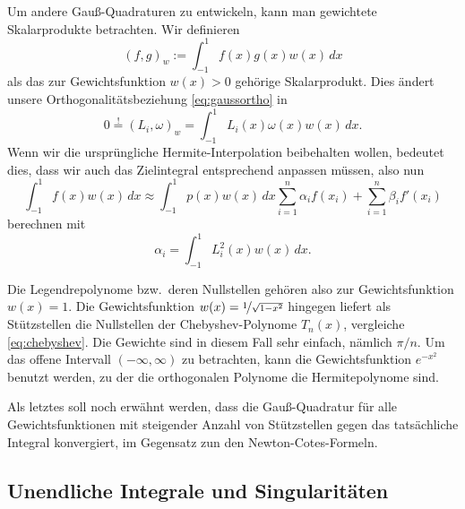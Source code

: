 Um andere Gauß-Quadraturen zu entwickeln, kann man gewichtete
Skalarprodukte betrachten. Wir definieren
\begin{equation}
  (f,g)_w := \int_{-1}^1 f(x)g(x)w(x)\, dx
\end{equation}
als das zur Gewichtsfunktion $w(x)>0$ gehörige Skalarprodukt. Dies
ändert unsere Orthogonalitätsbeziehung \eqref{eq:gaussortho} in
\begin{equation}
  0 \stackrel{!}{=} (L_i,\omega)_w = \int_{-1}^1 L_i(x)\omega(x)w(x)\, dx.
\end{equation}
Wenn wir die ursprüngliche Hermite-Interpolation beibehalten wollen,
bedeutet dies, dass wir auch das Zielintegral entsprechend anpassen
müssen, also nun
\begin{equation}
  \int_{-1}^1 f(x) w(x)\, dx \approx \int_{-1}^1 p(x) w(x)\, dx
  \sum_{i=1}^{n} \alpha_i f(x_i) + \sum_{i=1}^{n} \beta_i f'(x_i)
\end{equation}
berechnen mit
\begin{equation}
  \alpha_i = \int_{-1}^1 L_i^2(x)w(x)\, dx.
\end{equation}

Die Legendrepolynome bzw.\ deren Nullstellen gehören also zur
Gewichtsfunktion $w(x)=1$. Die Gewichtsfunktion
$w(x)=\nicefrac{1}{\sqrt{1-x^2}}$ hingegen liefert als Stützstellen
die Nullstellen der Chebyshev-Polynome $T_n(x)$, vergleiche
\eqref{eq:chebyshev}. Die Gewichte sind in diesem Fall sehr einfach,
nämlich $\pi/n$. Um das offene Intervall $(-\infty,\infty)$ zu
betrachten, kann die Gewichtsfunktion $e^{-x^2}$ benutzt werden, zu
der die orthogonalen Polynome die Hermitepolynome sind.

Als letztes soll noch erwähnt werden, dass die Gauß-Quadratur für alle
Gewichtsfunktionen mit steigender Anzahl von Stützstellen gegen das
tatsächliche Integral konvergiert, im Gegensatz zun den
Newton-Cotes-Formeln.

\subsection{Unendliche Integrale und Singularitäten}

